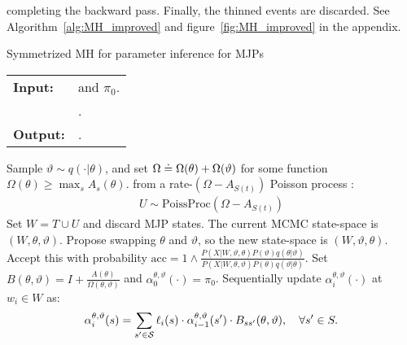    completing the backward pass. Finally, the thinned events are
   discarded. See Algorithm~\ref{alg:MH_improved} and 
   figure~\ref{fig:MH_improved} in the appendix. %
\begin{algorithm}[H]
   \caption{Symmetrized MH for parameter inference for MJPs }
   \label{alg:MH_improved}
  \begin{tabular}{l l}
   \textbf{Input:  } & \text{The observations $X$,}
                      \text{the MJP path $S(t) = (S, T)$, parameters $\theta$} and $\pi_0$.\\ 
                     & \text{A  Metropolis-Hasting proposal $q(\cdot | \theta)$}.\\
   \textbf{Output:  }& \text{A new MJP trajectory $S'(t) = (S', T')$, 
                            new MJP parameters $\theta'$}.\\
   \hline
   \end{tabular}
   \begin{algorithmic}[1]
      \State Sample $\vartheta \sim q(\cdot| \theta)$, and 
      set %
	$\Omega \doteq \Omega(\theta) + \Omega(\vartheta)$ for some function 
    $\Omega(\theta) \ge \max_s A_s(\theta)$.
       from a rate-$(\Omega-A_{S(t)})$ Poisson process : 
\begin{align*}
  U \sim \text{PoissProc}(\Omega - A_{S(t)}) 
\end{align*}
    \State Set $W = T \cup U$ and discard MJP states.
    \State The current MCMC state-space is $(W,\theta,\vartheta)$. 
    Propose swapping $\theta$ and $\vartheta$, so the new state-space is $(W,\vartheta,\theta)$. 
     Accept this with probability 
     $
     \text{acc} 
        =  1 \wedge \frac{P(X| W,\vartheta,\theta)P(\vartheta)q(\theta|\vartheta)}
        {P(X| W,\theta, \vartheta)P(\theta) q(\vartheta|\theta)}.
        $
    \State Set $B(\theta,\vartheta) = I + \frac{A(\theta)}{\Omega(\theta, \vartheta)}$ and $\alpha^{\theta, \vartheta}_0(\cdot) = \pi_0$.
    Sequentially update $\alpha^{\theta,\vartheta}_i(\cdot)$ at $w_i \in W$ as: 
    $$\alpha^{\theta,\vartheta}_i(s) = \sum_{s' \in {\mathcal S}} \ell_i(s) \cdot \alpha^{\theta,\vartheta}_{i-1}(s')\cdot B_{ss'}(\theta,\vartheta), \quad \forall s' \in S. $$

\end{algorithmic}
\end{algorithm}
